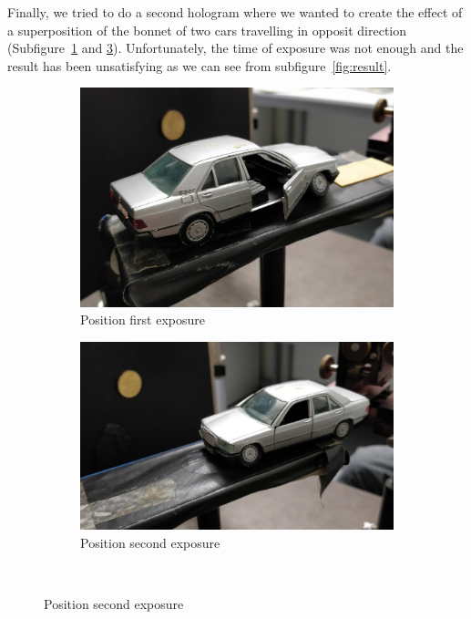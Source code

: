 \documentclass[11pt,a4paper]{article}
\begin{document}
Finally, we tried to do a second hologram where we wanted to create the effect of a superposition of the bonnet of two cars travelling in opposit direction (Subfigure~\ref{fig:dir1} and \ref{fig:dir2}). Unfortunately, the time of exposure was not enough and the result has been unsatisfying as we can see from subfigure~\ref{fig:result}.

\begin{figure}[ht]
\centering
\begin{subfigure}[b]{0.45\textwidth}
\includegraphics[width=\textwidth]{car_double_exposure_1}
\caption{Position first exposure}
\label{fig:dir1}
\end{subfigure}
\begin{subfigure}[b]{0.45\textwidth}
\includegraphics[width=\textwidth]{car_double_exposure_2}
\caption{Position second exposure}
\label{fig:dir2}
\end{subfigure}\\\vspace{.2cm}

\end{figure}
\end{document}
